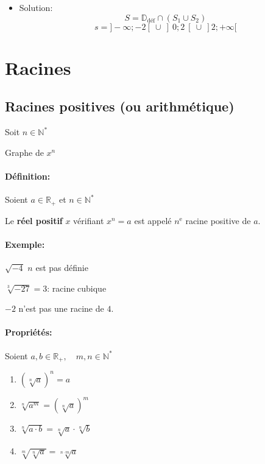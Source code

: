 \documentclass[
    11pt,
    a4paper,
    oneside,
    headinlcude, footinclude,
    twoside,
]{report}
\begin{document}
\begin{itemize}
    \item Solution:
        $$S = \mathbb{D}_{\text{d\'ef}} \cap (S_{1} \cup S_{2})$$
    $$s = ]-\infty; -2[\ \cup\ ]\ 0; 2\ [\ \cup\ ]2; +\infty[$$

\end{itemize}

\section{Racines}
\label{sec:racines}

\subsection{Racines positives (ou arithmétique)}
\label{sub:racines_positives_ou_arithmetique_}

Soit $n \in \mathbb{N}^{*}$

Graphe de $x^{n}$


\paragraph{Définition:}

Soient $a \in \mathbb{R}_{+}$ et $n \in \mathbb{N}^{*}$

Le \textbf{réel positif} $x$ vérifiant $x^{n} = a$ est appelé $n^{\text{e}}$
racine positive de $a$.

\paragraph{Exemple:}

$\sqrt{-4}$ $n$ est pas définie

$\sqrt[3]{-27} = 3$: racine cubique 

$-2$ n'est pas une racine de $4$.

\paragraph{Propriétés:}

Soient $a, b \in \mathbb{R}_{+}, \quad m,n \in \mathbb{N}^{*}$

\begin{enumerate}
    \item $(\sqrt[n]{a})^{n}  = a$
    \item $\sqrt[n]{a^{m}}  = (\sqrt[n]{a})^{m}$
    \item $\sqrt[n]{a \cdot b} = \sqrt[n]{a} \cdot \sqrt[n]{b}$
    \item $\sqrt[m]{\sqrt[n]{a}} = \sqrt[n\cdot m]{a}$
\end{enumerate}
\end{document}
